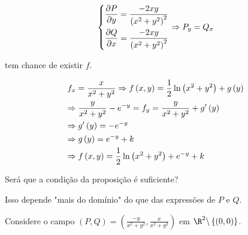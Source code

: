 \documentclass[11pt, oneside, a4paper]{gsm-l}
\begin{document}
\begin{sol}
\[
\left\{ \begin{gathered}
\frac{{\partial P}}
{{\partial y}} = \frac{{ - 2xy}}
{{\left( {x^2  + y^2 } \right)^2 }} \hfill \\
\frac{{\partial Q}}
{{\partial x}} = \frac{{ - 2xy}}
{{\left( {x^2  + y^2 } \right)^2 }} \hfill \\
\end{gathered}  \right. \Rightarrow P_y  = Q_x
\]

tem chance de existir $f$.

\[
\begin{gathered}
f_x  = \frac{x}
{{x^2  + y^2 }} \Rightarrow f\left( {x,y} \right) = \frac{1}
{2}\ln \left( {x^2  + y^2 } \right) + g\left( y \right) \hfill \\
\Rightarrow \frac{y}
{{x^2  + y^2 }} - e^{ - y}  = f_y  = \frac{y}
{{x^2  + y^2 }} + g'\left( y \right) \hfill \\
\Rightarrow g'\left( y \right) =  - e^{ - y}  \hfill \\
\Rightarrow g\left( y \right) = e^{ - y}  + k \hfill \\
\Rightarrow f\left( {x,y} \right) = \frac{1}
{2}\ln \left( {x^2  + y^2 } \right) + e^{ - y}  + k \hfill \\
\end{gathered}
\]

\end{sol}

Será que a condição da proposição é suficiente?

Isso depende "mais do domínio" do que das expressões de $P$ e $Q$.

\begin{exem}
Considere o campo $\left( {P,Q} \right) = \left( {\frac{{ - y}}
{{x^2  + y^2 }},\frac{x}
{{x^2  + y^2 }}} \right)$ em $\R^2 \backslash \left\{ {\left( {0,0} \right)} \right\}$.
\end{exem}
\end{document}
